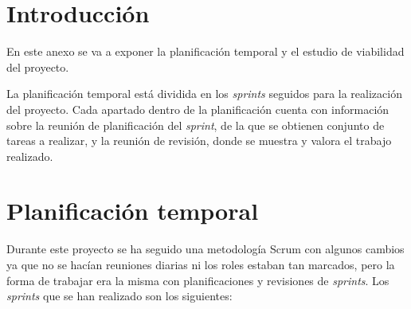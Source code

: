 
\section{Introducción}
En este anexo se va a exponer la planificación temporal y el estudio de viabilidad del proyecto.

La planificación temporal está dividida en los \textit{sprints} seguidos para la realización del proyecto.
Cada apartado dentro de la planificación cuenta con información sobre la reunión de planificación del \textit{sprint}, de la que se obtienen conjunto de tareas a realizar, y la reunión de revisión, donde se muestra y valora el trabajo realizado.

\section{Planificación temporal}
Durante este proyecto se ha seguido una metodología Scrum con algunos cambios ya que no se hacían reuniones diarias ni los roles estaban tan marcados, pero la forma de trabajar era la misma con planificaciones y revisiones de \textit{sprints}.
Los \textit{sprints} que se han realizado son los siguientes:

